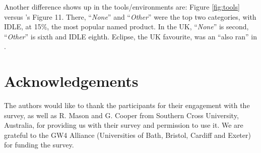 \documentclass[a4paper,11pt]{article}
\begin{document}
Another difference shows up in the tools/environments are: Figure
\ref{fig:tools} versus \cite{mason+cooper:2014}'s Figure 11. There,
``{\emph{None}}'' and ``{\emph{Other}}'' were the top two categories,
with IDLE, at 15\%, the most popular named product. In the UK,
``{\emph{None}}'' is second, ``{\emph{Other}}'' is sixth and IDLE
eighth. Eclipse, the UK favourite, was an ``also ran'' in
\cite{mason+cooper:2014}.

\section{Acknowledgements}

The authors would like to thank the participants for their engagement
with the survey, as well as R. Mason and G. Cooper from Southern Cross
University, Australia, for providing us with their survey and
permission to use it. We are grateful to the GW4 Alliance
(Universities of Bath, Bristol, Cardiff and Exeter) for funding the
survey.



\end{document}
